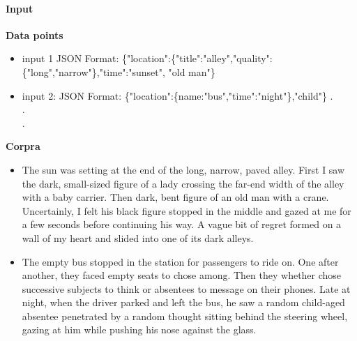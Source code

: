 \documentclass{article}
\begin{document}
			\paragraph{Input} 
				\textbf{Data points}
				\begin{itemize}
					\item input 1 JSON Format: \{"location":\{"title":"alley","quality":\{"long","narrow"\},"time":"sunset", "old man"\}
					\item input 2: JSON Format: \{"location":\{name:"bus","time":"night"\},"child"\}
					.\\
					.\\
					.\\
				\end{itemize}
				\textbf{Corpra}
				\begin{itemize}
					\item The sun was setting at the end of the long, narrow, paved alley. First I saw the dark, small-sized figure of a  lady crossing the far-end width of the alley with a baby carrier. Then dark, bent figure of an old man with a crane.  Uncertainly, I felt his black figure stopped in the middle and gazed at me for a few seconds before continuing his way. A vague bit of regret formed on a wall of my heart and slided into one of its dark alleys.
					\item The empty bus stopped in the station for passengers to ride on. One after another, they faced empty seats to chose among. Then they whether chose successive subjects to think or absentees to message on their phones. Late at night, when the driver parked and left the bus, he saw a random child-aged absentee penetrated by a random thought sitting behind the steering wheel, gazing at him while pushing his nose against the glass. 
				\end{itemize}
\end{document}
